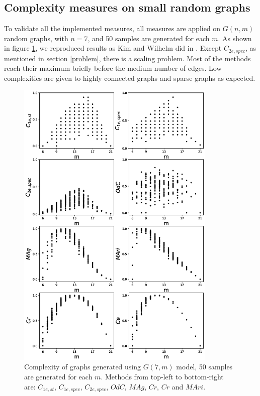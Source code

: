 \documentclass[12pt]{article}
\begin{document}
\subsection{Complexity measures on small random graphs}
\label{complexity}
To validate all the implemented measures, all measures are applied on $G(n,m)$ random graphs, with $n=7$, and 50 samples are generated for each $m$. As shown in figure \ref{fig:small_graphs}, we reproduced results as Kim and Wilhelm did in \cite{KIM20082637}. Except $C_{2e,spec}$, as mentioned in section \ref{problem}, there is a scaling problem. Most of the methods reach their maximum briefly before the medium number of edges. Low complexities are given to highly connected graphs and sparse graphs as expected.\par
\clearpage
\newpage
\begin{figure}[p!]
    \includegraphics[width=0.85\textwidth]{complexities.eps}
    \vspace*{-0.8in}
    \centering
    \caption{Complexity of graphs generated using $G(7,m)$ model, 50 samples are generated for each $m$. Methods from top-left to bottom-right are: $C_{1e,st}$, $C_{1e,spec}$, $C_{2e,spec}$, $OdC$, $MAg$, $Cr$, $Cr$ and $MAri$.}
    \label{fig:small_graphs}
    \clearpage
\end{figure}
\end{document}
